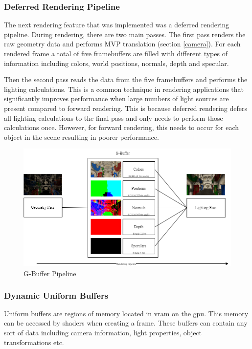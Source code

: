 \documentclass[11pt]{article}
\begin{document}
\subsubsection{Deferred Rendering Pipeline}
The next rendering feature that was implemented was a deferred rendering
pipeline. During rendering, there are two main passes. The first pass renders
the raw geometry data and performs MVP translation (section \ref{camera}). For
each rendered frame a total of five framebuffers are filled with different types of
information including colors, world positions, normals, depth and specular.

Then the second pass reads the data from the five framebuffers and performs the
lighting calculations. This is a common technique in rendering applications that
significantly improves performance when large numbers of light sources are
present compared to forward rendering. This is because deferred rendering defers
all lighting calculations to the final pass and only needs to perform those
calculations once. However, for forward rendering, this needs to occur for each
object in the scene resulting in poorer performance.

\begin{figure}[h!]
  \centering
  \includegraphics[width=\textwidth]{images/g_buffer.png}
  \caption{G-Buffer Pipeline}
  \label{fig:g_buffer}
\end{figure}



\subsubsection{Dynamic Uniform Buffers}
Uniform buffers are regions of memory located in \gls{vram} on the \gls{gpu}.
This memory can be accessed by shaders when creating a frame. These buffers can
contain any sort of data including camera information, light properties, object
transformations etc.
\end{document}
